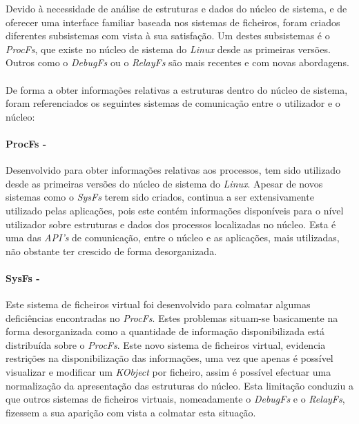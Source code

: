 Devido à necessidade de análise de estruturas e dados do núcleo de sistema, e de oferecer uma interface familiar baseada nos sistemas de ficheiros, foram criados diferentes subsistemas com vista à sua satisfação.
Um destes subsistemas é o \textit{ProcFs}, que existe no núcleo de sistema do \textit{Linux} desde as primeiras versões.
Outros como o \textit{DebugFs} ou o \textit{RelayFs} são mais recentes e com novas abordagens.

\paragraph*{}
De forma a obter informações relativas a estruturas dentro do núcleo de sistema, foram referenciados os seguintes sistemas de comunicação entre o utilizador e o núcleo:

\paragraph*{ProcFs - }\label{cap:ProcFs_overview}

Desenvolvido para obter informações relativas aos processos, tem sido utilizado desde as primeiras versões do núcleo de sistema do \textit{Linux}.
Apesar de novos sistemas como o \textit{SysFs} terem sido criados, continua a ser extensivamente utilizado pelas aplicações, pois este contém informações disponíveis para o nível utilizador sobre estruturas e dados dos processos localizadas no núcleo.
Esta é uma das \textit{API's} de comunicação, entre o núcleo e as aplicações, mais utilizadas, não obstante ter crescido de forma desorganizada.

\paragraph*{SysFs - }\label{cap:SysFs_overview}

Este sistema de ficheiros virtual foi desenvolvido para colmatar algumas deficiências encontradas no \textit{ProcFs}.
Estes problemas situam-se basicamente na forma desorganizada como a quantidade de informação disponibilizada está distribuída sobre o \textit{ProcFs}.
Este novo sistema de ficheiros virtual, evidencia restrições na disponibilização das informações, uma vez que apenas é possível visualizar e modificar um \textit{KObject} por ficheiro, assim é possível efectuar uma normalização da apresentação das estruturas do núcleo.
Esta limitação conduziu a que outros sistemas de ficheiros virtuais, nomeadamente o \textit{DebugFs} e o \textit{RelayFs}, fizessem a sua aparição com vista a colmatar esta situação.

